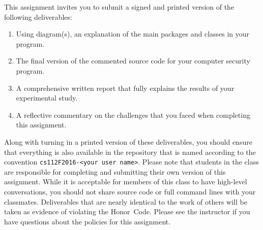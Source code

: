 This assignment invites you to submit a signed and printed version of the following deliverables:

\vspace*{-.1in}
\begin{enumerate}

  \itemsep0pt

  \item Using diagram(s), an explanation of the main packages and classes in your program.

  \item The final version of the commented source code for your computer security program.

  \item A comprehensive written report that fully explains the results of your experimental study.

  \item A reflective commentary on the challenges that you faced when completing this assignment.

\end{enumerate}
\vspace*{-.1in}

Along with turning in a printed version of these deliverables, you should ensure that everything is also available in
the repository that is named according to the convention {\tt cs112F2016-<your user name>}. Please note that students in
the class are responsible for completing and submitting their own version of this assignment. While it is acceptable for
members of this class to have high-level conversations, you should not share source code or full command lines with your
classmates. Deliverables that are nearly identical to the work of others will be taken as evidence of violating the
\mbox{Honor Code}. Please see the instructor if you have questions about the policies for this assignment.



